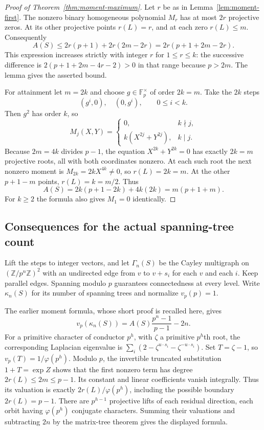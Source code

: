 \begin{proof}[Proof of Theorem~\ref{thm:moment-maximum}]
Let $r$ be as in Lemma~\ref{lem:moment-first}. The nonzero binary homogeneous
polynomial $M_r$ has at most $2r$ projective zeros. At its other projective
points $r(L)=r$, and at each zero $r(L)\le m$. Consequently
\[
 A(S)\le 2r(p+1)+2r(2m-2r)
         =2r(p+1+2m-2r).
\]
This expression increases strictly with integer $r$ for $1\le r\le k$:
the successive difference is $2(p+1+2m-4r-2)>0$ in that range because
$p>2m$. The lemma gives the asserted bound.

For attainment let $m=2k$ and choose $g\in\mathbb F_p^\times$ of order
$2k=m$. Take the $2k$ steps
\[
 (g^i,0),\quad(0,g^i),\qquad 0\le i<k.
\]
Then $g^2$ has order $k$, so
\[
 M_j(X,Y)=
 \begin{cases}
  0,&k\nmid j,\\
  k(X^{2j}+Y^{2j}),&k\mid j.
 \end{cases}
\]
Because $2m=4k$ divides $p-1$, the equation $X^{2k}+Y^{2k}=0$
has exactly $2k=m$ projective roots, all with both coordinates nonzero.
At each such root the next nonzero moment is
$M_{2k}=2kX^{4k}\ne0$, so $r(L)=2k=m$. At the other $p+1-m$ points,
$r(L)=k=m/2$. Thus
\[
  A(S)=2k(p+1-2k)+4k(2k)=m(p+1+m).
\]
For $k\ge2$ the formula also gives $M_1=0$ identically.
\end{proof}

\subsection{Consequences for the actual spanning-tree count}
Lift the steps to integer vectors, and let $\Gamma_n(S)$ be the Cayley
multigraph on $(\mathbb Z/p^n\mathbb Z)^2$ with an undirected edge from
$v$ to $v+s_i$ for each $v$ and each $i$. Keep parallel edges. Spanning
modulo $p$ guarantees connectedness at every level. Write $\kappa_n(S)$
for its number of spanning trees and normalize $v_p(p)=1$.

The earlier moment formula, whose short proof is recalled here, gives
\[
       v_p(\kappa_n(S))=A(S)\frac{p^n-1}{p-1}-2n.
\]
For a primitive character of conductor $p^h$, with $\zeta$ a primitive
$p^h$th root, the corresponding Laplacian eigenvalue is
$\sum_i(2-\zeta^{u\cdot s_i}-\zeta^{-u\cdot s_i})$.
Set $T=\zeta-1$, so $v_p(T)=1/\varphi(p^h)$. Modulo $p$, the invertible
truncated substitution $1+T=\exp Z$ shows that the first nonzero term has
degree $2r(L)\le2m\le p-1$. Its constant and linear coefficients vanish
integrally. Thus its valuation is exactly $2r(L)/\varphi(p^h)$, including
the possible boundary $2r(L)=p-1$. There are $p^{h-1}$ projective lifts
of each residual direction, each orbit having $\varphi(p^h)$ conjugate
characters. Summing their valuations and subtracting $2n$ by the
matrix-tree theorem gives the displayed formula.

